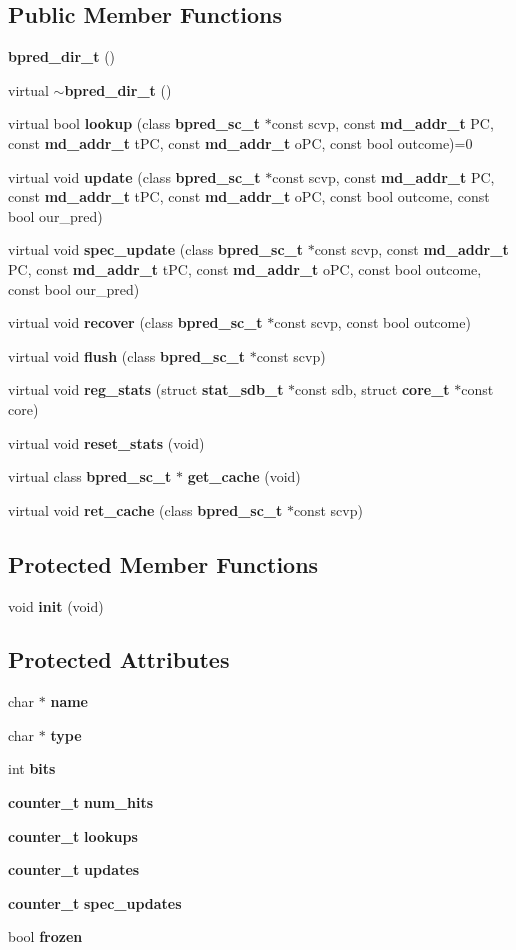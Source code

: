 \subsection*{Public Member Functions}
\begin{CompactItemize}
\item 
{\bf bpred\_\-dir\_\-t} ()
\item 
virtual {\bf $\sim$bpred\_\-dir\_\-t} ()
\item 
virtual bool {\bf lookup} (class {\bf bpred\_\-sc\_\-t} $\ast$const scvp, const {\bf md\_\-addr\_\-t} PC, const {\bf md\_\-addr\_\-t} tPC, const {\bf md\_\-addr\_\-t} oPC, const bool outcome)=0
\item 
virtual void {\bf update} (class {\bf bpred\_\-sc\_\-t} $\ast$const scvp, const {\bf md\_\-addr\_\-t} PC, const {\bf md\_\-addr\_\-t} tPC, const {\bf md\_\-addr\_\-t} oPC, const bool outcome, const bool our\_\-pred)
\item 
virtual void {\bf spec\_\-update} (class {\bf bpred\_\-sc\_\-t} $\ast$const scvp, const {\bf md\_\-addr\_\-t} PC, const {\bf md\_\-addr\_\-t} tPC, const {\bf md\_\-addr\_\-t} oPC, const bool outcome, const bool our\_\-pred)
\item 
virtual void {\bf recover} (class {\bf bpred\_\-sc\_\-t} $\ast$const scvp, const bool outcome)
\item 
virtual void {\bf flush} (class {\bf bpred\_\-sc\_\-t} $\ast$const scvp)
\item 
virtual void {\bf reg\_\-stats} (struct {\bf stat\_\-sdb\_\-t} $\ast$const sdb, struct {\bf core\_\-t} $\ast$const core)
\item 
virtual void {\bf reset\_\-stats} (void)
\item 
virtual class {\bf bpred\_\-sc\_\-t} $\ast$ {\bf get\_\-cache} (void)
\item 
virtual void {\bf ret\_\-cache} (class {\bf bpred\_\-sc\_\-t} $\ast$const scvp)
\end{CompactItemize}
\subsection*{Protected Member Functions}
\begin{CompactItemize}
\item 
void {\bf init} (void)
\end{CompactItemize}
\subsection*{Protected Attributes}
\begin{CompactItemize}
\item 
char $\ast$ {\bf name}
\item 
char $\ast$ {\bf type}
\item 
int {\bf bits}
\item 
{\bf counter\_\-t} {\bf num\_\-hits}
\item 
{\bf counter\_\-t} {\bf lookups}
\item 
{\bf counter\_\-t} {\bf updates}
\item 
{\bf counter\_\-t} {\bf spec\_\-updates}
\item 
bool {\bf frozen}
\end{CompactItemize}
